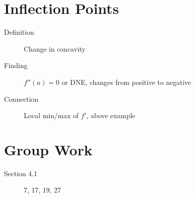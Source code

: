 \documentclass[11pt]{article}
\begin{document}
\section*{Inflection Points}

\begin{description}
\item[Definition] Change in concavity
\item[Finding] $f''(a)=0$ or DNE, changes from positive to negative
\item[Connection] Local min/max of $f'$, above example
\end{description}

\section*{Group Work}
\begin{description}
\item[Section 4.1] 7, 17, 19, 27
\end{description}
\end{document}
